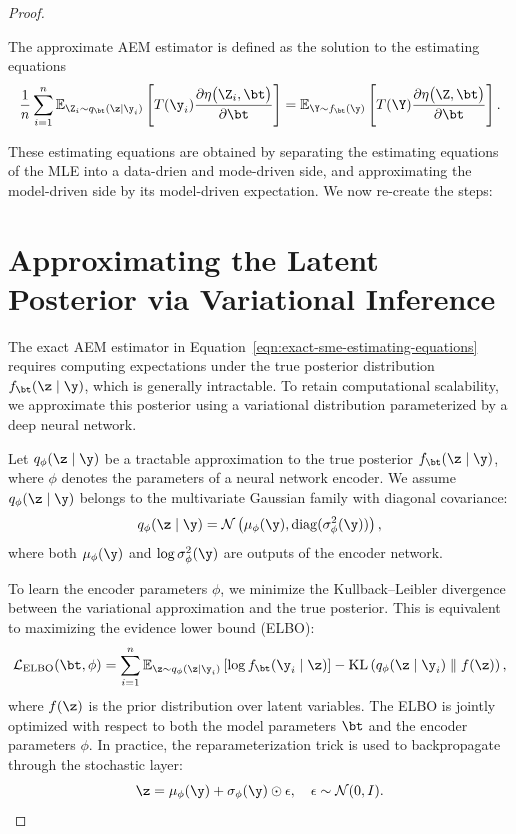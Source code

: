\begin{proof}
\begin{tcolorbox}[colback=blue!3!white,colframe=blue!70!black,title=The Approximate AEM Estimator]
The approximate AEM estimator is defined as the solution to the estimating equations
\begin{equation}
\frac{1}{n} \sum_{i=1}^{n} 
\mathbb{E}_{\Z_i \sim q_\bt(\z \mid \y_i)} \left[
    T(\y_i)
    \frac{\partial \eta\bigl( \Z_i, \bt \bigr)}{\partial \bt}
\right]
=
\mathbb{E}_{\Y \sim f_\bt(\y)} \left[
    T(\Y)
    \frac{\partial \eta\bigl( \Z, \bt \bigr)}{\partial \bt}
\right].
\label{eqn:exact-sme-estimating-equations}
\end{equation}

These estimating equations are obtained by separating the estimating equations of the MLE into a data-drien and mode-driven side, and approximating the model-driven side by its model-driven expectation. We now re-create the steps:

\end{tcolorbox}


\newpage

\section{Approximating the Latent Posterior via Variational Inference}
\label{sec:approximate-posterior}

The exact AEM estimator in Equation~\eqref{eqn:exact-sme-estimating-equations} requires computing expectations under the true posterior distribution \( f_\bt(\z \mid \y) \), which is generally intractable. To retain computational scalability, we approximate this posterior using a variational distribution parameterized by a deep neural network.

Let \( q_\phi(\z \mid \y) \) be a tractable approximation to the true posterior \( f_\bt(\z \mid \y) \), where \( \phi \) denotes the parameters of a neural network encoder. We assume \( q_\phi(\z \mid \y) \) belongs to the multivariate Gaussian family with diagonal covariance:
\[
q_\phi(\z \mid \y) = \mathcal{N} \left( \mu_\phi(\y), \operatorname{diag}(\sigma^2_\phi(\y)) \right),
\]
where both \( \mu_\phi(\y) \) and \( \log \sigma^2_\phi(\y) \) are outputs of the encoder network.

To learn the encoder parameters \( \phi \), we minimize the Kullback--Leibler divergence between the variational approximation and the true posterior. This is equivalent to maximizing the evidence lower bound (ELBO):
\[
\mathcal{L}_{\text{ELBO}}(\bt, \phi) = \sum_{i=1}^n \mathbb{E}_{\z \sim q_\phi(\z \mid \y_i)} \left[ \log f_\bt(\y_i \mid \z) \right] - \mathrm{KL}\left( q_\phi(\z \mid \y_i) \parallel f(\z) \right),
\]
where \( f(\z) \) is the prior distribution over latent variables. The ELBO is jointly optimized with respect to both the model parameters \( \bt \) and the encoder parameters \( \phi \). In practice, the reparameterization trick is used to backpropagate through the stochastic layer:
\[
\z = \mu_\phi(\y) + \sigma_\phi(\y) \odot \epsilon, \quad \epsilon \sim \mathcal{N}(0, I).
\]


\end{proof}
